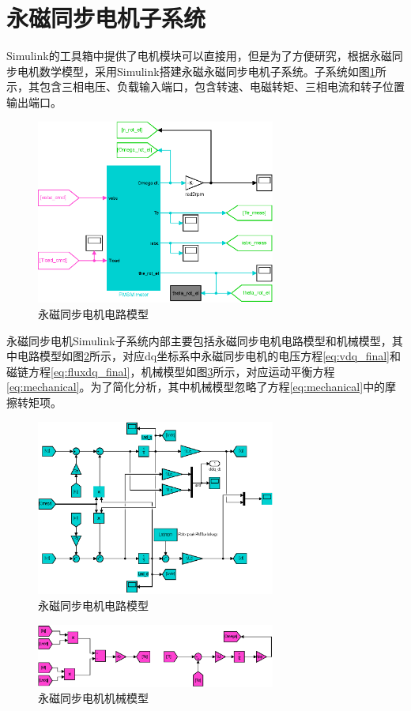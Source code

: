 \section{永磁同步电机子系统}
Simulink的工具箱中提供了电机模块可以直接用，但是为了方便研究，根据永磁同步电机数学模型，采用Simulink搭建永磁永磁同步电机子系统。子系统如图\ref{fig:PMSM_subsystem}所示，其包含三相电压、负载输入端口，包含转速、电磁转矩、三相电流和转子位置输出端口。
\begin{figure}[H]
	\centering
	\includegraphics[width=0.7\textwidth]{figs/PMSM_subsystem.eps}
	\caption{永磁同步电机电路模型}
	\label{fig:PMSM_subsystem}
\end{figure}
永磁同步电机Simulink子系统内部主要包括永磁同步电机电路模型和机械模型，其中电路模型如图\ref{fig:PMSM_model}所示，对应dq坐标系中永磁同步电机的电压方程\ref{eq:vdq_final}和磁链方程\ref{eq:fluxdq_final}，机械模型如图\ref{fig:PMSM_model_mec}所示，对应运动平衡方程\ref{eq:mechanical}。为了简化分析，其中机械模型忽略了方程\ref{eq:mechanical}中的摩擦转矩项。
\begin{figure}[H]
	\centering
	\includegraphics[width=0.7\textwidth]{figs/PMSM_model.eps}
	\caption{永磁同步电机电路模型}
	\label{fig:PMSM_model}
\end{figure}
\begin{figure}[H]
	\centering
	\includegraphics[width=0.7\textwidth]{figs/mechanical.eps}
	\caption{永磁同步电机机械模型}
	\label{fig:PMSM_model_mec}
\end{figure}
